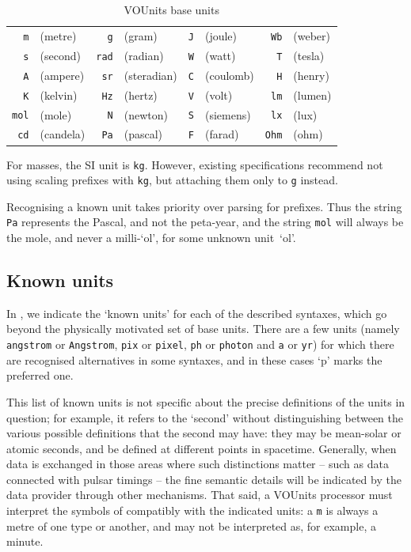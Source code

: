 \documentclass[11pt,a4paper]{ivoa}
\newcommand{\unit}[1]{\texttt{\small\color{orange}#1}}
\begin{document}
\begin{table}[ht]
\begin{center}
\def\arraystretch{1.2}
\begin{tabular}{|rl|rl|rl|rl|}\hline
\unit{m}&(metre)		&\unit{g}&(gram) 	&\unit{J}&(joule)     	&\unit{Wb}&(weber)\\
\unit{s}&(second)		&\unit{rad}&(radian)    &\unit{W}&(watt) 	&\unit{T}&(tesla)\\
\unit{A}&(ampere)		&\unit{sr}&(steradian)  &\unit{C}&(coulomb)	&\unit{H}&(henry)\\
\unit{K}&(kelvin)		&\unit{Hz}&(hertz)      &\unit{V}&(volt) 	&\unit{lm}&(lumen)\\
\unit{mol}&(mole)		&\unit{N}&(newton)      &\unit{S}&(siemens)	&\unit{lx}&(lux)\\
\unit{cd}&(candela)		&\unit{Pa}&(pascal)     &\unit{F}&(farad)	&\unit{Ohm}&(ohm)\\\hline
\end{tabular}
\end{center}
\caption{\label{tab:voubase}VOUnits base units}
\end{table}

For masses, the SI unit is \unit{kg}. However, existing specifications
recommend not using scaling prefixes with \unit{kg}, but attaching them
only to \unit{g} instead.

Recognising a known unit takes priority over parsing for prefixes.
Thus the string \unit{Pa} represents the Pascal, and not the
peta-year, and the string \unit{mol} will always be the mole, and
never a milli-`ol', for some unknown unit~`ol'.

\subsection{Known units\label{sec:knownunits}}

In , we indicate the `known units' for each of the
described syntaxes, which go beyond the physically motivated set of
base units.
There are a few units (namely \unit{angstrom} or \unit{Angstrom},
\unit{pix} or \unit{pixel}, \unit{ph} or \unit{photon} and \unit{a} or \unit{yr}) for
which there are recognised alternatives in some syntaxes, and in these
cases `p' marks the preferred one.

This list of known units is not specific about the precise definitions
of the units in question; for example, it refers to the `second'
without distinguishing between the various possible definitions that
the second may have: they may be mean-solar or atomic seconds, and be
defined at different points in spacetime.  Generally, when data is
exchanged in those areas where such distinctions matter -- such as
data connected with pulsar timings -- the fine semantic details will
be indicated by the data provider through other mechanisms.  That
said, a VOUnits processor must interpret the symbols
of  compatibly with the indicated units:
a \unit{m} is always a metre of one type or another, and may not be
interpreted as, for example, a minute.
\end{document}
